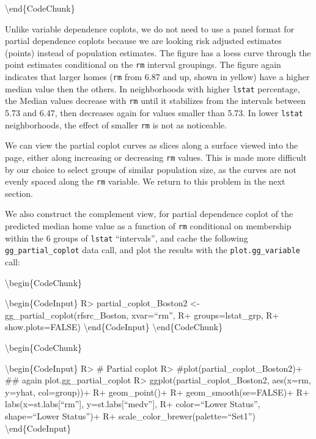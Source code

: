 \documentclass[article]{jss}
\begin{document}
\textbackslash{}end\{CodeChunk\}

Unlike variable dependence coplots, we do not need to use a panel format
for partial dependence coplots because we are looking risk adjusted
estimates (points) instead of population estimates. The figure has a
loess curve through the point estimates conditional on the \texttt{rm}
interval groupings. The figure again indicates that larger homes
(\texttt{rm} from 6.87 and up, shown in yellow) have a higher median
value then the others. In neighborhoods with higher \texttt{lstat}
percentage, the Median values decrease with \texttt{rm} until it
stabilizes from the intervals between 5.73 and 6.47, then decreases
again for values smaller than 5.73. In lower \texttt{lstat}
neighborhoods, the effect of smaller \texttt{rm} is not as noticeable.

We can view the partial coplot curves as slices along a surface viewed
into the page, either along increasing or decreasing \texttt{rm} values.
This is made more difficult by our choice to select groups of similar
population size, as the curves are not evenly spaced along the
\texttt{rm} variable. We return to this problem in the next section.

We also construct the complement view, for partial dependence coplot of
the predicted median home value as a function of \texttt{rm} conditional
on membership within the 6 groups of \texttt{lstat} ``intervals'', and
cache the following \texttt{gg\_partial\_coplot} data call, and plot the
results with the \texttt{plot.gg\_variable} call:

\textbackslash{}begin\{CodeChunk\}

\textbackslash{}begin\{CodeInput\} R\textgreater{}
partial\_coplot\_Boston2 \textless{}- gg\_partial\_coplot(rfsrc\_Boston,
xvar=``rm'', R+ groups=lstat\_grp, R+ show.plots=FALSE)
\textbackslash{}end\{CodeInput\} \textbackslash{}end\{CodeChunk\}

\textbackslash{}begin\{CodeChunk\}

\textbackslash{}begin\{CodeInput\} R\textgreater{} \# Partial coplot
R\textgreater{} \#plot(partial\_coplot\_Boston2)+ \#\# again
plot.gg\_partial\_coplot R\textgreater{}
ggplot(partial\_coplot\_Boston2, aes(x=rm, y=yhat, col=group))+ R+
geom\_point()+ R+ geom\_smooth(se=FALSE)+ R+ labs(x=st.labs{[}``rm''{]},
y=st.labs{[}``medv''{]}, R+ color=``Lower Status'', shape=``Lower
Status'')+ R+ scale\_color\_brewer(palette=``Set1'')
\textbackslash{}end\{CodeInput\}
\end{document}
